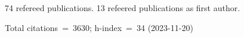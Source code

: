 74 refereed publications. 13 refeered publications as first author.

Total citations~=~3630; h-index~=~34 (2023-11-20)